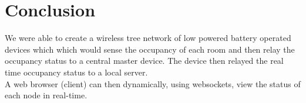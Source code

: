 \chapter{Conclusion}
We were able to create a wireless tree network of low powered battery operated devices which which would sense the occupancy of each room and then relay the occupancy status to a central master
device. The device then relayed the real time occupancy status to a local server. 
\\
A web browser (client) can then dynamically, using websockets, view the status of each node in real-time.

